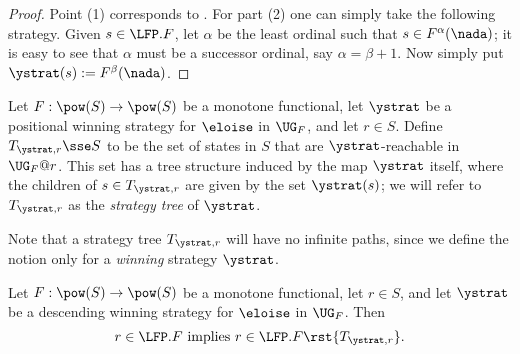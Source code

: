 \begin{proof}
Point (1) corresponds to \cite[Theorem 3.14(2)]{Ven08}.
For part (2) one can simply take the following strategy.
Given $s \in \LFP.F$, let $\alpha$ be the least ordinal such that $s \in 
F^{\alpha}(\nada)$; it is easy to see that $\alpha$ must be a successor ordinal,
say $\alpha = \beta + 1$. 
Now simply put $\ystrat(s) := F^{\beta}(\nada)$.
\end{proof}

\begin{definition}
\label{d:str-tree}
Let $F: \pow(S)\to \pow(S)$ be a monotone functional, let $\ystrat$ be a 
positional winning strategy for $\eloise$ in $\UG_{F}$, and let $r \in S$. 
Define $T_{\ystrat,r} \sse S$ to be the set of states in $S$ that are 
$\ystrat$-reachable in $\UG_{F}@r$.
This set has a tree structure induced by the map $\ystrat$ itself, where the 
children of $s \in T_{\ystrat,r}$ are given by the set $\ystrat(s)$; we will
refer to $T_{\ystrat,r}$ as the \emph{strategy tree} of
$\ystrat$.
\end{definition}
Note that a strategy tree $T_{\ystrat,r}$ will have no infinite paths, since we
define the notion only for a \emph{winning} strategy $\ystrat$.

\begin{proposition}
\label{p:afmc-2}
Let $F: \pow(S)\to \pow(S)$ be a monotone functional, let $r \in S$, and let 
$\ystrat$ be a descending winning strategy for $\eloise$ in $\UG_{F}$.
Then
\begin{equation}
\label{eq:afmc3}
r \in \LFP. F \text{ implies } r \in \LFP. F\rst{T_{\ystrat,r}}.
\end{equation}
\end{proposition}

